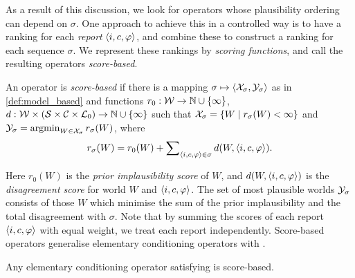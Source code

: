 
As a result of this discussion, we look for operators whose plausibility
ordering can depend on $\sigma$. One approach to achieve this in a controlled
way is to have a ranking for each
\emph{report} $\langle {i, c, \varphi} \rangle$, and combine these to construct a ranking
for each sequence $\sigma$. We represent these rankings by \emph{scoring
functions}, and call the resulting operators \emph{score-based}.

\begin{definition}
\label{def:score_based}
    An operator is \emph{score-based} if there is a mapping $\sigma \mapsto
    \langle {\mathcal{X}_\sigma, \mathcal{Y}_\sigma} \rangle$ as in \cref{def:model_based} and functions
    $r_0: \mathcal{W} \to \mathbb{N} \cup \{\infty\}$, $d: \mathcal{W} \times (\mathcal{S} \times \mathcal{C} \times \mathcal{L}{}_0) \to \mathbb{N} \cup \{\infty\}$
    such that $\mathcal{X}_\sigma = \{W \mid r_\sigma(W) < \infty\}$ and $\mathcal{Y}_\sigma =
    \operatorname{argmin}_{W \in \mathcal{X}_\sigma}{r_\sigma(W)}$, where
    \[
        r_\sigma(W) = r_0(W) + \sum\nolimits_{\langle {i, c, \varphi} \rangle \in \sigma}{
            d(W, \langle {i, c, \varphi} \rangle)
        }.
    \]

\end{definition}

Here $r_0(W)$ is the \emph{prior implausibility score} of $W$, and $d(W,
\langle {i, c, \varphi} \rangle)$ is the \emph{disagreement score} for world $W$ and $\langle {i,
c, \varphi} \rangle$. The set of most plausible worlds $\mathcal{Y}_\sigma$ consists of those $W$
which minimise the sum of the prior implausibility and the total
disagreement with $\sigma$. Note that by summing the scores
of each report $\langle {i, c, \varphi} \rangle$ with equal weight, we treat each report independently.
%
Score-based operators generalise elementary conditioning operators with \kconj{}.

\begin{proposition}
\label{prop:kconj_conditioning_implies_score_based}
    Any elementary conditioning operator satisfying \kconj{} is score-based.
\end{proposition}

